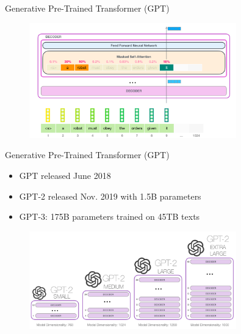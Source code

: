 \documentclass[serif, aspectratio=169]{beamer}
\begin{document}
\begin{frame}{Generative Pre-Trained Transformer (GPT)}
    \begin{figure}
        \centering
        \includegraphics[width=0.8\textwidth]{Figures/GPT2.png}
    \end{figure}
\end{frame}

\begin{frame}{Generative Pre-Trained Transformer (GPT)}
    \begin{itemize}
        \item GPT released June 2018
        \item GPT-2 released Nov. 2019 with 1.5B parameters
        \item GPT-3: 175B parameters trained on 45TB texts
    \end{itemize}   
    \begin{figure}
        \centering
        \includegraphics[width=0.8\textwidth]{Figures/GPT3.png}
    \end{figure}
\end{frame}
\end{document}
